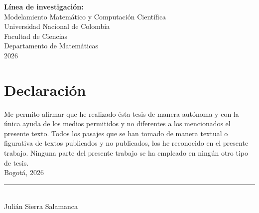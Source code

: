 \documentclass[10pt,spanish,openany,twoside,letterpaper]{book}
\newcommand{\studentname}{}
\newcommand{\submissiondate}{}
\newcommand{\resgroupone}{}
\newcommand{\resgrouptwo}{}
\newcommand{\researchtopic}{}
\newcommand{\codirector}{} %
\newcommand{\codirectortitle}{} %
\newcommand{\issuedate}{}
\newcommand{\sede}{}
\newcommand{\department}{}
\newcommand{\faculty}{}
\newcommand{\university}{Universidad Nacional de Colombia}
\renewcommand{\studentname}{Julián Sierra Salamanca}
\renewcommand{\issuedate}{2026}
\renewcommand{\submissiondate}{2026}
\renewcommand{\researchtopic}{Modelamiento Matemático y Computación Científica}
\renewcommand{\sede}{Bogotá}
\renewcommand{\department}{Departamento de Matemáticas}
\renewcommand{\faculty}{Facultad de Ciencias}
\begin{document}
{\begin{center}
\vspace{1.5cm}
\textbf{Línea de investigación:} \\ 
\researchtopic\\
\vspace{1.5cm} 
\university \\
\faculty \\
\department \\
\issuedate
\end{center}


\newpage
\chapter*{\sffamily Declaración}
\par Me permito afirmar que he realizado ésta tesis de manera autónoma y con la única ayuda de los medios permitidos y no diferentes a los mencionados el presente texto. Todos los pasajes que se han tomado de manera textual o figurativa de textos publicados y no publicados, los he reconocido en el presente trabajo. Ninguna parte del presente trabajo se ha empleado en ningún otro tipo de tesis. 
\\[1em]
\sede, \submissiondate
\\[6em]
\rule{6cm}{0.5pt}\\
\studentname
}
\end{document}
